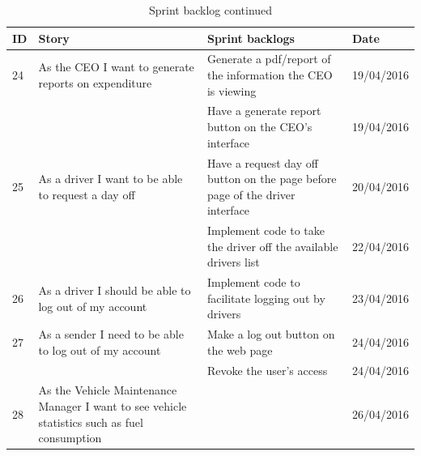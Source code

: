 \documentclass[paper=a4, fontsize=11pt]{scrartcl} %
\numberwithin{equation}{section} %
\numberwithin{figure}{section} %
\numberwithin{table}{section} %
\begin{document}
\begin{table}[!hbt]
\centering
\caption{Sprint backlog continued}
\label{SprintBacklogTableFourth}
\begin{tabular}{|p{1cm}|p{5cm}|p{5cm}|p{2cm}|}
\hline
\textbf{ID} & \textbf{Story}                                                                               & \textbf{Sprint backlogs}                                                      & \textbf{Date} \\ \hline
24          & As the CEO I want to generate reports on expenditure                                         & Generate a pdf/report of the information the CEO is viewing                   & 19/04/2016    \\ \hline
            &                                                                                              & Have a generate report button on the CEO's interface                          & 19/04/2016    \\ \hline
25          & As a driver I want to be able to request a day off                                           & Have a request day off button on the page before page of the driver interface & 20/04/2016    \\ \hline
            &                                                                                              & Implement code to take the driver off the available drivers list              & 22/04/2016    \\ \hline
26          & As a driver I should be able to log out of my account                                        & Implement code to facilitate logging out by drivers                           & 23/04/2016    \\ \hline
27          & As a sender I need to be able to log out of my account                                       & Make a log out button on the web page                                         & 24/04/2016    \\ \hline
            &                                                                                              & Revoke the user's access                                                      & 24/04/2016    \\ \hline
28          & As the Vehicle Maintenance Manager I want to see vehicle statistics such as fuel consumption &                                                                               & 26/04/2016    \\ \hline
\end{tabular}
\end{table}
\end{document}

